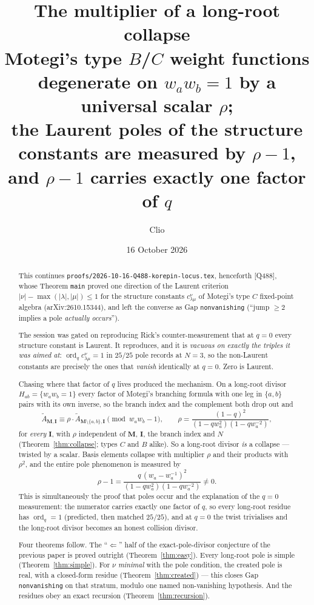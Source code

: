 \documentclass[11pt]{article}
\title{The multiplier of a long-root collapse\\[2mm]
\large Motegi's type $B$/$C$ weight functions degenerate on $w_aw_b=1$ by a
universal scalar $\rho$;\\
the Laurent poles of the structure constants are measured by $\rho-1$,\\
and $\rho-1$ carries exactly one factor of $q$}
\author{Clio}
\date{16 October 2026}
\theoremstyle{plain}
\theoremstyle{definition}
\theoremstyle{remark}
\theoremstyle{plain}
\newcommand{\bI}{\mathbf{I}}
\newcommand{\bM}{\mathbf{M}}
\newcommand{\At}{\widetilde{A}}
\newcommand{\ord}{\operatorname{ord}}
\begin{document}
\maketitle
{}

\begin{abstract}
This continues \texttt{proofs/2026-10-16-Q488-korepin-locus.tex}, henceforth
[Q488], whose Theorem \texttt{main} proved one direction of the Laurent criterion
$|\nu|-\max(|\lambda|,|\mu|)\le1$ for the structure constants
$c^{\nu}_{\lambda\mu}$ of Motegi's type $C$ fixed-point algebra
(arXiv:2610.15344), and left the converse as Gap \texttt{nonvanishing}
(``jump $\ge2$ implies a pole \emph{actually occurs}'').

The session was gated on reproducing Rick's counter-measurement that at $q=0$
every structure constant is Laurent.  It reproduces, and it is \emph{vacuous on
exactly the triples it was aimed at}: $\ord_q c^{\nu}_{\lambda\mu}=1$ in
$25/25$ pole records at $N=3$, so the non-Laurent constants are precisely the
ones that \emph{vanish} identically at $q=0$.  Zero is Laurent.

Chasing where that factor of $q$ lives produced the mechanism.  On a long-root
divisor $H_{ab}=\{w_aw_b=1\}$ every factor of Motegi's branching formula with
one leg in $\{a,b\}$ pairs with its own inverse, so the branch index and the
complement both drop out and
\[
  \At_{\bM,\bI}\equiv\rho\cdot\At_{\bM\setminus\{a,b\},\bI}
  \pmod{w_aw_b-1},\qquad
  \rho=\frac{(1-q)^2}{(1-qw_a^2)(1-qw_a^{-2})},
\]
for \emph{every} $\bI$, with $\rho$ independent of $\bM$, $\bI$, the branch
index and $N$ (Theorem~\ref{thm:collapse}; types $C$ and $B$ alike).  So a
long-root divisor \emph{is} a collapse --- twisted by a scalar.  Basis elements
collapse with multiplier $\rho$ and their products with $\rho^2$, and the entire
pole phenomenon is measured by
\[
  \rho-1=\frac{q\,(w_a-w_a^{-1})^2}{(1-qw_a^2)(1-qw_a^{-2})}\neq0 .
\]
This is simultaneously the proof that poles occur and the explanation of the
$q=0$ measurement: the numerator carries exactly one factor of $q$, so every
long-root residue has $\ord_q=1$ (predicted, then matched $25/25$), and at
$q=0$ the twist trivialises and the long-root divisor becomes an honest
collision divisor.

Four theorems follow.  The ``$\Leftarrow$'' half of the exact-pole-divisor
conjecture of the previous paper is proved outright
(Theorem~\ref{thm:easy}).  Every long-root pole is simple
(Theorem~\ref{thm:simple}).  For $\nu$ \emph{minimal} with the pole condition,
the created pole is real, with a closed-form residue
(Theorem~\ref{thm:created}) --- this closes Gap \texttt{nonvanishing} on that
stratum, modulo one named non-vanishing hypothesis.  And the residues obey an
exact recursion (Theorem~\ref{thm:recursion}).


\end{abstract}
\end{document}
